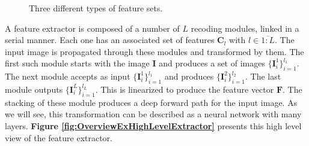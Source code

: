 \documentclass[12pt,a4paper,oneside,english]{UPBThesis}
\newcommand{\hcrange}[2]{\overline{{#1}\colon\!\!{#2}}}
\begin{document}
\begin{figure}
\centering
{}
\caption{Three different types of feature sets.}
\label{fig:OverviewExFeatures}
\end{figure}

A feature extractor is composed of a number of $L$ recoding modules, linked in a serial manner. Each one has an associated set of features $\textbf{C}_l$ with $l \in \hcrange{1}{L}$. The input image is propagated through these modules and transformed by them. The first such module starts with the image $\textbf{I}$ and produces a set of images $\{\textbf{I}_i^1\}_{i=1}^{l_1}$. The next module accepts as input $\{\textbf{I}_i^1\}_{i=1}^{l_1}$ and produces $\{\textbf{I}_i^2\}_{i=1}^{l_2}$. The last module outputs $\{\textbf{I}_i^L\}_{i=1}^{l_L}$. This is linearized to produce the feature vector $\mathbf{F}$. The stacking of these module produces a deep forward path for the input image. As we will see, this transformation can be described as a neural network with many layers. \textbf{Figure \ref{fig:OverviewExHighLevelExtractor}} presents this high level view of the feature extractor.
\end{document}
